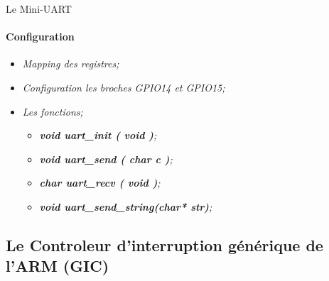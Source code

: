 \documentclass[french]{beamer}
\begin{document}
\begin{frame}{Le Mini-UART}
	\framesubtitle{Configuration}
	\begin{beamerboxesrounded}[scheme=blocgrisclair]{}
		\begin{center}
			\begin{itemize}
				\color{nb}
				\large
				\item<1-> \textit{Mapping des registres;}
				\item<2-> \textit{Configuration les broches GPIO14 et GPIO15;}
				\item<3-> \textit{Les fonctions;}
				\begin{itemize}
					\color{white}
					\item<4-> \textit{\textbf{void uart\_init ( void )};}
					\item<5-> \textit{\textbf{void uart\_send ( char c )};}
					\item<6-> \textit{\textbf{char uart\_recv ( void )};}
					\item<7-> \textit{\textbf{void uart\_send\_string(char* str)};}
				\end{itemize}
			\end{itemize}
		\end{center}
	\end{beamerboxesrounded}
\end{frame}

\subsection{Le Controleur d'interruption générique de l'ARM (GIC)}
\begin{frame}
	\transsplitverticalout
\end{frame}
\end{document}
